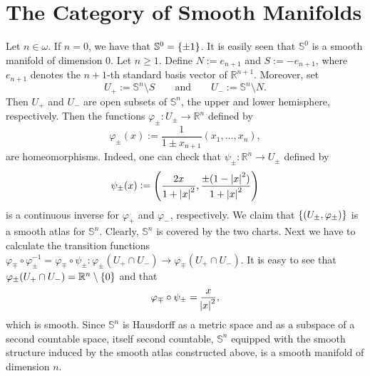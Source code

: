 \section*{The Category of Smooth Manifolds}

\begin{example}[$n$-Spheres]
	Let $n \in \omega$. If $n = 0$, we have that $\mathbb{S}^0 = \cbr{\pm 1}$. It is easily seen that $\mathbb{S}^0$ is a smooth manifold of dimension $0$. Let $n \geq 1$. Define $N := e_{n + 1}$ and $S := -e_{n + 1}$, where $e_{n + 1}$ denotes the $n + 1$-th standard basis vector of $\mathbb{R}^{n + 1}$. Moreover, set
	\begin{equation*}
		U_+ := \mathbb{S}^n \setminus S \qquad \text{and} \qquad U_- := \mathbb{S}^n \setminus N.
	\end{equation*}
	Then $U_+$ and $U_-$ are open subsets of $\mathbb{S}^n$, the upper and lower hemisphere, respectively. Then the functions $\varphi_\pm : U_\pm \to \mathbb{R}^n$ defined by
	\begin{equation*}
		\varphi_\pm(x) := \frac{1}{1 \pm x_{n + 1}}(x_1,\dots,x_n),
	\end{equation*}
	\noindent are homeomorphisms. Indeed, one can check that $\psi_\pm : \mathbb{R}^n \to U_\pm$ defined by
	\begin{equation*}
		\psi_\pm(x) := \del[4]{\frac{2x}{1 + \abs[0]{x}^2}, \frac{\pm(1 - \abs[0]{x}^2)}{1 + \abs[0]{x}^2}} 
	\end{equation*}
	\noindent is a continuous inverse for $\varphi_+$ and $\varphi_-$, respectively. We claim that $\cbr[0]{(U_\pm,\varphi_\pm)}$ is a smooth atlas for $\mathbb{S}^n$. Clearly, $\mathbb{S}^n$ is covered by the two charts. Next we have to calculate the transition functions $\varphi_\mp \circ \varphi^{-1}_\pm = \varphi_\mp \circ \psi_\pm : \varphi_\pm(U_+ \cap U_-) \to \varphi_\mp(U_+ \cap U_-)$. It is easy to see that $\varphi_\pm(U_+ \cap U_-) = \mathbb{R}^n \setminus \cbr{0}$ and that
	\begin{equation*}
		\varphi_\mp \circ \psi_\pm = \frac{x}{\abs{x}^2},
	\end{equation*}
	\noindent which is smooth. Since $\mathbb{S}^n$ is Hausdorff as a metric space and as a subspace of a second countable space, itself second countable, $\mathbb{S}^n$ equipped with the smooth structure induced by the smooth atlas constructed above, is a smooth manifold of dimension $n$.
\end{example}
